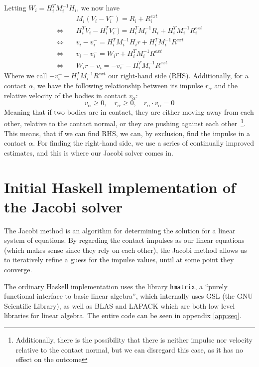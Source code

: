\documentclass[runningheads,a4paper]{llncs}
\begin{document}
Letting $W_i = H_i^TM_i^{-1}H_i$, we now have
\begin{align}
  & M_i(V_i - V_i^-) = R_i + R_i^{ext} \\
  \Leftrightarrow \quad & H_i^T V_i - H_i^T V_i^-) = H_i^TM_i^{-1} R_i + H_i^T
  M_i^{-1} R_i^{ext}
  \\
  \Leftrightarrow \quad & v_i - v_i^{-} = H_i^T M_i^{-1}H_i r + H_i^T M_i^{-1} R^{ext} \\
  \Leftrightarrow \quad & v_i - v_i^{-} = W_i r + H_i^T M_i^{-1} R^{ext} \\
  \Leftrightarrow \quad & W_i r - v_i = -v_i^{-} - H_i^T M_i^{-1} R^{ext}
\end{align}
Where we call $-v_i^{-} - H_i^T M_i^{-1} R^{ext}$ our right-hand side (RHS).
Additionally, for a contact $\alpha$, we have the following relationship between
its impulse $r_\alpha$ and the relative velocity of the bodies in contact
$v_\alpha$:
\begin{equation}\label{impulseXvectorConstraint}
  v_\alpha \geq 0, \quad r_\alpha \geq 0, \quad r_\alpha \cdot v_\alpha = 0
\end{equation}
Meaning that if two bodies are in contact, they are either moving away from
each other, relative to the contact normal, or they are pushing against each
other~\footnote{Additionally, there is the possibility that there is neither
  impulse nor velocity relative to the contact normal, but we can disregard
  this case, as it has no effect on the outcome}. This means, that if we can
find RHS, we can, by exclusion, find the impulse in a contact $\alpha$. For
finding the right-hand side, we use a series of continually improved estimates,
and this is where our Jacobi solver comes in.

\section{Initial Haskell implementation of the Jacobi solver\label{seqjacobi}}

The Jacobi method is an algorithm for determining the solution for a linear
system of equations. By regarding the contact impulses as our linear equations
(which makes sense since they rely on each other), the Jacobi method allows us
to iteratively refine a guess for the impulse values, until at some point they
converge.

The ordinary Haskell implementation uses the library \verb+hmatrix+, a ``purely
functional interface to basic linear algebra'', which internally uses GSL (the
GNU Scientific Library), as well as BLAS and LAPACK which are both low level
libraries for linear algebra. The entire code can be seen in appendix
\ref{app:seq}.
\end{document}
